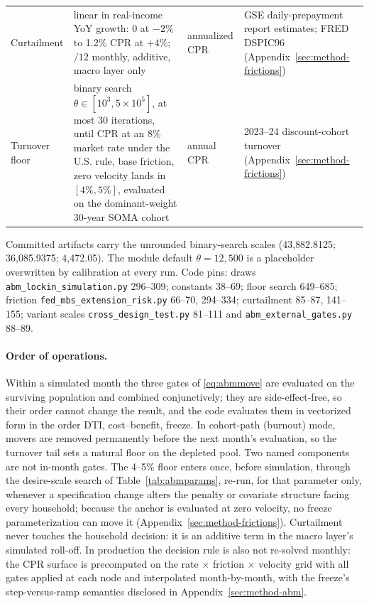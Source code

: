 \documentclass[12pt]{article}
\begin{document}
\begin{table}[H]
\begin{threeparttable}
\begin{tabular}{@{}p{3.3cm}p{5.9cm}p{1.6cm}p{4.0cm}@{}}
Curtailment & linear in real-income YoY growth: 0 at $-2\%$ to 1.2\% CPR at $+4\%$; $/12$ monthly, additive, macro layer only & annualized CPR & GSE daily-prepayment report estimates; FRED DSPIC96 (Appendix~\ref{sec:method-frictions}) \\
Turnover floor & binary search $\theta \in [10^{3}, 5\times10^{5}]$, at most 30 iterations, until CPR at an 8\% market rate under the U.S. rule, base friction, zero velocity lands in $[4\%, 5\%]$, evaluated on the dominant-weight 30-year SOMA cohort & annual CPR & 2023--24 discount-cohort turnover (Appendix~\ref{sec:method-frictions}) \\
\bottomrule
\end{tabular}
\begin{tablenotes}
\footnotesize
\item Committed artifacts carry the unrounded binary-search scales (43{,}882.8125; 36{,}085.9375; 4{,}472.05). The module default $\theta = 12{,}500$ is a placeholder overwritten by calibration at every run. Code pins: draws \texttt{abm\_lockin\_simulation.py} 296--309; constants 38--69; floor search 649--685; friction \texttt{fed\_mbs\_extension\_risk.py} 66--70, 294--334; curtailment 85--87, 141--155; variant scales \texttt{cross\_design\_test.py} 81--111 and \texttt{abm\_external\_gates.py} 88--89.
\end{tablenotes}
\end{threeparttable}
\end{table}

\paragraph{Order of operations.}
Within a simulated month the three gates of \eqref{eq:abmmove} are evaluated on the surviving population and combined conjunctively; they are side-effect-free, so their order cannot change the result, and the code evaluates them in vectorized form in the order DTI, cost--benefit, freeze. %
In cohort-path (burnout) mode, movers are removed permanently before the next month's evaluation, so the turnover tail sets a natural floor on the depleted pool. %
Two named components are not in-month gates. The 4--5\% floor enters once, before simulation, through the desire-scale search of Table~\ref{tab:abmparams}, re-run, for that parameter only, whenever a specification change alters the penalty or covariate structure facing every household; because the anchor is evaluated at zero velocity, no freeze parameterization can move it (Appendix~\ref{sec:method-frictions}). %
Curtailment never touches the household decision: it is an additive term in the macro layer's simulated roll-off. In production the decision rule is also not re-solved monthly: the CPR surface is precomputed on the rate $\times$ friction $\times$ velocity grid with all gates applied at each node and interpolated month-by-month, with the freeze's step-versus-ramp semantics disclosed in Appendix~\ref{sec:method-abm}. %
\end{document}
